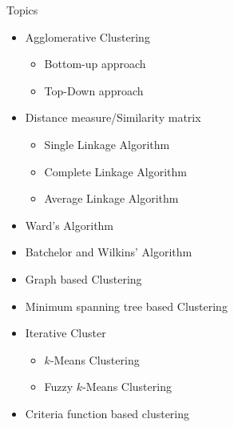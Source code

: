\begin{frame}{Topics}
\begin{itemize}
\item Agglomerative Clustering
\begin{itemize}
\item Bottom-up approach
\item Top-Down approach
\end{itemize}
\item Distance measure/Similarity matrix
\begin{itemize}
\item Single Linkage Algorithm
\item Complete Linkage Algorithm
\item Average Linkage Algorithm
\end{itemize}
\item Ward's Algorithm
\item Batchelor and Wilkins' Algorithm
\item Graph based Clustering
\item Minimum spanning tree based Clustering
\item Iterative Cluster
\begin{itemize}
\item $k$-Means Clustering
\item Fuzzy $k$-Means Clustering
\end{itemize}
\item Criteria function based clustering
\end{itemize}
\end{frame}